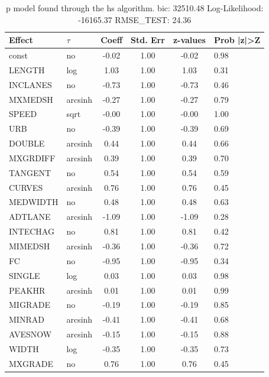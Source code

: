 \begin{table}
	\caption{p model found through the hs algorithm. bic: 32510.48 Log-Likelihood: -16165.37 RMSE_TEST: 24.36}
	\begin{center}
		\begin{tabular}{|l|l|c|c|c|l|}
			\hline
			Effect & $\tau$ & Coeff & Std. Err & z-values & Prob |z|>Z \\
			\hline
			const & no & -0.02 & 1.00 & -0.02 & 0.98 \\
			\hline
			LENGTH & log & 1.03 & 1.00 & 1.03 & 0.31 \\
			\hline
			INCLANES & no & -0.73 & 1.00 & -0.73 & 0.46 \\
			\hline
			MXMEDSH & arcsinh & -0.27 & 1.00 & -0.27 & 0.79 \\
			\hline
			SPEED & sqrt & -0.00 & 1.00 & -0.00 & 1.00 \\
			\hline
			URB & no & -0.39 & 1.00 & -0.39 & 0.69 \\
			\hline
			DOUBLE & arcsinh & 0.44 & 1.00 & 0.44 & 0.66 \\
			\hline
			MXGRDIFF & arcsinh & 0.39 & 1.00 & 0.39 & 0.70 \\
			\hline
			TANGENT & no & 0.54 & 1.00 & 0.54 & 0.59 \\
			\hline
			CURVES & arcsinh & 0.76 & 1.00 & 0.76 & 0.45 \\
			\hline
			MEDWIDTH & no & 0.48 & 1.00 & 0.48 & 0.63 \\
			\hline
			ADTLANE & arcsinh & -1.09 & 1.00 & -1.09 & 0.28 \\
			\hline
			INTECHAG & no & 0.81 & 1.00 & 0.81 & 0.42 \\
			\hline
			MIMEDSH & arcsinh & -0.36 & 1.00 & -0.36 & 0.72 \\
			\hline
			FC & no & -0.95 & 1.00 & -0.95 & 0.34 \\
			\hline
			SINGLE & log & 0.03 & 1.00 & 0.03 & 0.98 \\
			\hline
			PEAKHR & arcsinh & 0.01 & 1.00 & 0.01 & 0.99 \\
			\hline
			MIGRADE & no & -0.19 & 1.00 & -0.19 & 0.85 \\
			\hline
			MINRAD & arcsinh & -0.41 & 1.00 & -0.41 & 0.68 \\
			\hline
			AVESNOW & arcsinh & -0.15 & 1.00 & -0.15 & 0.88 \\
			\hline
			WIDTH & log & -0.35 & 1.00 & -0.35 & 0.73 \\
			\hline
			MXGRADE & no & 0.76 & 1.00 & 0.76 & 0.45 \\
			\hline

\end{tabular}
\end{center}
\end{table}
